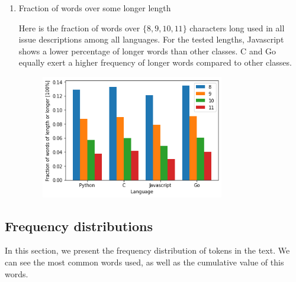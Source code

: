 \documentclass[]{article}
\begin{document}
\begin{enumerate}
    \item Fraction of words over some longer length

          Here is the fraction of words over $\{8, 9, 10, 11\}$ characters long used in all issue descriptions among all languages. For the tested lengths, Javascript shows a lower percentage of longer words than other classes. C and Go equally exert a higher frequency of longer words compared to other classes.

          \begin{figure}[H]
              \includegraphics[width=8cm]{long_words.png}
              \centering
          \end{figure}

\end{enumerate}

\subsection{Frequency distributions}

In this section, we present the frequency distribution of tokens in the text. We can see the most common words used, as well as the cumulative value of this words.
\end{document}
